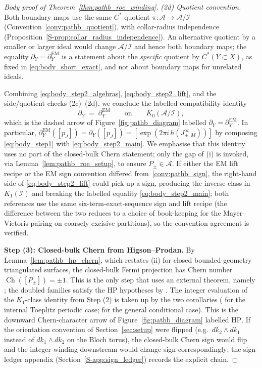 \documentclass[11pt]{article}
\numberwithin{equation}{section}
\theoremstyle{definition}
\theoremstyle{remark}
\newcommand{\Ch}{\operatorname{Ch}}
\begin{document}
\begin{proof}[Body proof of Theorem~\ref{thm:pathb_roe_winding}]
\smallskip
\emph{(2d) Quotient convention.} Both boundary maps use the same \(C^*\)-quotient
\(\pi:\mathcal A\to\mathcal A/\mathcal I\) (Convention~\ref{conv:pathb_quotient}), with
collar-radius independence (Proposition~\ref{S-prop:collar_radius_independence}). An
alternative quotient by a smaller or larger ideal would change \(\mathcal A/\mathcal I\) and
hence both boundary maps; the equality
\(\partial_Y=\partial^{\mathrm{EM}}_Y\) is a statement about the \emph{specific} quotient by
\(C^*(Y\subset X)\), as fixed in \eqref{eq:body_short_exact}, and not about boundary maps for
unrelated ideals.

\smallskip
Combining \eqref{eq:body_step2_algebras}, \eqref{eq:body_step2_lift}, and the side/quotient
checks (2c)--(2d), we conclude the labelled compatibility identity
\begin{equation}\label{eq:body_step2_main}
\partial_Y\;=\;\partial^{\mathrm{EM}}_Y
\qquad\text{on}\qquad K_0(\mathcal A/\mathcal I),
\end{equation}
which is the dashed arrow of Figure~\ref{fig:pathb_diagram} labelled
\(\partial_Y=\partial^{\mathrm{EM}}_Y\). In particular,
\(\partial^{\mathrm{EM}}_Y([p_J])=\partial_Y([p_J])
=[\exp(2\pi i\,h(J_{\pm,M}^\infty))]\) by composing \eqref{eq:body_step1} with
\eqref{eq:body_step2_main}. We emphasise that this identity uses no part of the closed-bulk
Chern statement; only the gap of (i) is invoked, via
Lemma~\ref{lem:pathb_roe_setup}, to ensure \(P_\pm\in\mathcal A\). If either the EM lift recipe
or the EM sign convention differed from~\ref{conv:pathb_sign}, the right-hand side of
\eqref{eq:body_step2_lift} could pick up a sign, producing the inverse class in
\(K_1(\mathcal I)\) and breaking the labelled equality \eqref{eq:body_step2_main}; both
references \cite{EwertMeyer2019,HigsonRoeI} use the same six-term-exact-sequence sign and lift
recipe (the difference between the two reduces to a choice of book-keeping for the
Mayer--Vietoris pairing on coarsely excisive partitions), so the convention agreement is
verified.

\medskip\noindent\textbf{Step (3): Closed-bulk Chern from Higson--Prodan.}
By Lemma~\ref{lem:pathb_hp_chern}, which restates (ii) for closed
bounded-geometry triangulated surfaces, the closed-bulk Fermi projection has Chern number
\(\Ch([P_\pm])=\pm1\). This is the only step that uses an external theorem, namely
; the doubled families satisfy the HP hypotheses by
. The integer evaluation of the \(K_1\)-class identity from
Step (2) is taken up by the two corollaries ( for the internal
Toeplitz periodic case;  for the general conditional case).
This is the downward Chern-character arrow of Figure~\ref{fig:pathb_diagram} labelled
\(\mathrm{HP}\). If the orientation convention of Section~\ref{sec:setup} were flipped (e.g.\
\(dk_2\wedge dk_1\) instead of \(dk_1\wedge dk_2\) on the Bloch torus), the closed-bulk Chern
sign would flip and the integer winding downstream would change sign correspondingly; the
sign-ledger appendix (Section~\ref{S-app:sign_ledger}) records the explicit chain.


\end{proof}
\end{document}
